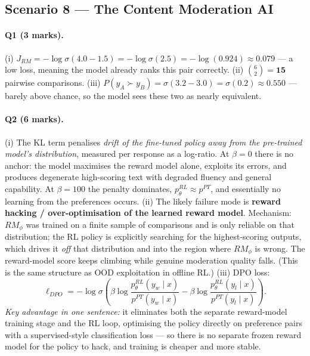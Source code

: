 \documentclass[11pt,a4paper]{article}
\begin{document}
\subsection{Scenario 8 --- The Content Moderation AI}

\paragraph{Q1 (3 marks).}
(i) $J_{RM}=-\log\sigma(4.0-1.5)=-\log\sigma(2.5)=-\log(0.924)\approx\mathbf{0.079}$
--- a low loss, meaning the model already ranks this pair correctly.
(ii) $\binom{6}{2}=\mathbf{15}$ pairwise comparisons.
(iii) $P(y_A\succ y_B)=\sigma(3.2-3.0)=\sigma(0.2)\approx\mathbf{0.550}$ ---
barely above chance, so the model sees these two as nearly equivalent.

\paragraph{Q2 (6 marks).}
(i) The KL term penalises \emph{drift of the fine-tuned policy away from the
pre-trained model's distribution}, measured per response as a log-ratio. At
$\beta=0$ there is no anchor: the model maximises the reward model alone,
exploits its errors, and produces degenerate high-scoring text with degraded
fluency and general capability. At $\beta=100$ the penalty dominates,
$p^{RL}_\theta\approx p^{PT}$, and essentially no learning from the
preferences occurs.
(ii) The likely failure mode is \textbf{reward hacking / over-optimisation of
the learned reward model}. Mechanism: $RM_\phi$ was trained on a finite
sample of comparisons and is only reliable on that distribution; the RL policy
is explicitly searching for the highest-scoring outputs, which drives it
\emph{off} that distribution and into the region where $RM_\phi$ is wrong.
The reward-model score keeps climbing while genuine moderation quality falls.
(This is the same structure as OOD exploitation in offline RL.)
(iii) DPO loss:
\[
\ell_{DPO}=-\log\sigma\!\left(\beta\log\frac{p^{RL}_\theta(y_w\mid x)}{p^{PT}(y_w\mid x)}
-\beta\log\frac{p^{RL}_\theta(y_l\mid x)}{p^{PT}(y_l\mid x)}\right).
\]
\emph{Key advantage in one sentence:} it eliminates both the separate
reward-model training stage and the RL loop, optimising the policy directly on
preference pairs with a supervised-style classification loss --- so there is no
separate frozen reward model for the policy to hack, and training is cheaper
and more stable.
\end{document}
